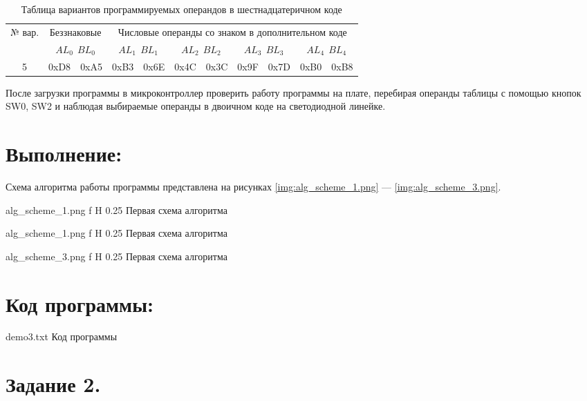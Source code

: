 \documentclass{bmstu}
\begin{document}
\begin{center}
\begin{table}[H]
\caption{Таблица вариантов программируемых операндов в шестнадцатеричном коде}
\label{table:var_table}
\begin{tabular}{| c | c | c | c | c | c | c | c | c | c | c |}
	\hline
	\multirow{2}{4em}{№ вар.}&\multicolumn{2}{|c|}{Беззнаковые}& \multicolumn{8}{|c|}{Числовые операнды со знаком в дополнительном коде} \\
	\cline{2-11}
	& \multicolumn{2}{|c|}{$AL_0~~BL_0$} & \multicolumn{2}{|c|}{$AL_1~~BL_1$} &  \multicolumn{2}{|c|}{$AL_2~~BL_2$}
		& \multicolumn{2}{|c|}{$AL_3~~BL_3$} & \multicolumn{2}{|c|}{$AL_4~~BL_4$} \\
	\hline
	5 &0xD8 & 0xA5 & 0xB3 & 0x6E & 0x4C & 0x3C & 0x9F & 0x7D & 0xB0 & 0xB8 \\
	\hline
\end{tabular}
\end{table}
\end{center}

После загрузки программы в микроконтроллер проверить работу программы на плате, перебирая операнды таблицы с помощью кнопок SW0, SW2 и наблюдая выбираемые операнды в двоичном коде на светодиодной линейке. 

\newpage
\chapter{Выполнение:}
Схема алгоритма работы программы представлена на рисунках \ref{img:alg_scheme_1.png} --- \ref{img:alg_scheme_3.png}.

	{alg_scheme_1.png}
	{f}
	{H}
	{0.25\textwidth} %
    {Первая схема алгоритма} 

	{alg_scheme_1.png}
	{f}
	{H}
	{0.25\textwidth} %
    {Первая схема алгоритма} 
    
	{alg_scheme_3.png}
	{f}
	{H}
	{0.25\textwidth} %
    {Первая схема алгоритма} 

\chapter{Код программы:}

	{demo3.txt}
	{Код программы}

\newpage 
\chapter{Задание 2.}	
 
\end{document}
